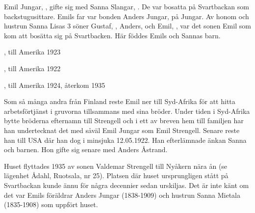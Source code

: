 

Emil Jungar, ,  gifte sig med Sanna Slangar, . De var bosatta på Svartbackan som backstugusittare. Emils far var bonden Anders Jungar,  på Jungar. Av honom och hustrun Sanna Lisas 3 söner Gustaf, , Anders,  och Emil, , var det sonen Emil som kom att bosätta sig på Svartbacken. Här föddes Emils och Sannas barn.
\begin{jhchildren}
  \item {}, till Amerika 1923
  \item {}, till Amerika 1922
  \item {}, till Amerika 1924, återkom 1935
\end{jhchildren}

Som så många andra från Finland reste Emil ner till Syd-Afrika för att hitta arbetsförtjänst i gruvorna tillsammans med sina bröder. Under tiden i Syd-Afrika bytte bröderna efternamn till Strengell och i ett av breven hem till familjen har han undertecknat det med såväl Emil Jungar som Emil Strengell. Senare reste han till USA där han dog i  minsjuka 12.05.1922. Han efterlämnade änkan Sanna och barnen. Hon gifte sig senare med Anders Åstrand.

Huset flyttades 1935 av sonen Valdemar Strengell till Nyåkern nära ån (se lägenhet Ådahl, Ruotsala, nr 25). Platsen där huset ursprungligen stått på Svartbackan kunde ännu för några decennier sedan urskiljas. Det är inte känt om det var Emils föräldrar Anders Jungar (1838-1909) och hustrun Sanna \textborn Mietala (1835-1908) som uppfört huset.
